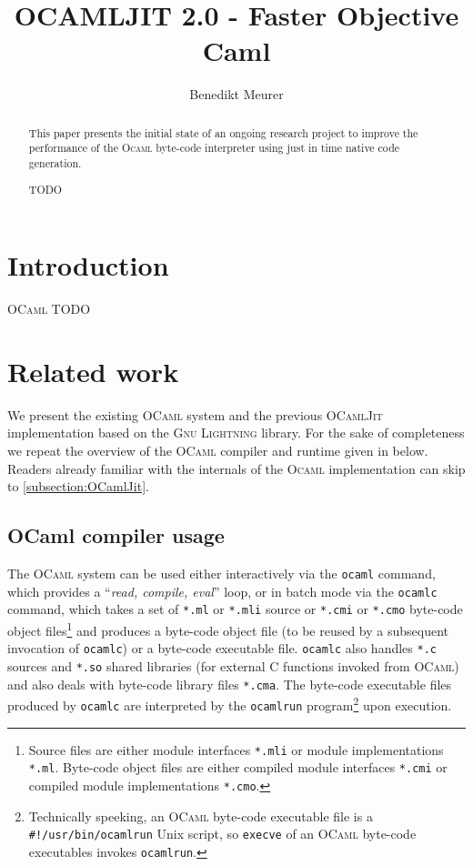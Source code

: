\documentclass[10pt,a4paper,twocolumn]{article}
\author{Benedikt Meurer}
\title{OCAMLJIT 2.0 - Faster Objective Caml}
\begin{document}
\maketitle

\begin{abstract}
  This paper presents the initial state of an ongoing research
  project to improve the performance of the \textsc{Ocaml}
  byte-code interpreter using just in time native code generation.

  TODO
\end{abstract}


\section{Introduction}

\textsc{OCaml}\cite{Leroy10} TODO


\section{Related work}

We present the existing \textsc{OCaml} system and the previous \textsc{OCamlJit}\cite{Starynkevitch04}
implementation based on the \textsc{Gnu Lightning} library\cite{Bonzini10}. For the sake of completeness
we repeat the overview of the \textsc{OCaml} compiler and runtime given in \cite{Starynkevitch04} below.
Readers already familiar with the internals of the \textsc{Ocaml} implementation can skip to
\ref{subsection:OCamlJit}.

\subsection{OCaml compiler usage}

The \textsc{OCaml} system can be used either interactively via the \texttt{ocaml} command, which
provides a ``\textit{read, compile, eval}'' loop, or in batch mode via the \texttt{ocamlc}
command, which takes a set of \texttt{*.ml} or \texttt{*.mli} source or \texttt{*.cmi} or
\texttt{*.cmo} byte-code object files\footnote{Source files are either module interfaces
  \texttt{*.mli} or module implementations \texttt{*.ml}. Byte-code object files are either
  compiled module interfaces \texttt{*.cmi} or compiled module implementations \texttt{*.cmo}.}
and produces a byte-code object file (to be reused by a subsequent invocation of \texttt{ocamlc})
or a byte-code executable file. \texttt{ocamlc} also handles \texttt{*.c} sources and \texttt{*.so}
shared libraries (for external C functions invoked from \textsc{OCaml}) and also deals with
byte-code library files \texttt{*.cma}. The byte-code executable files produced by \texttt{ocamlc}
are interpreted by the \texttt{ocamlrun} program\footnote{Technically speeking, an \textsc{OCaml}
  byte-code executable file is a \texttt{\#!/usr/bin/ocamlrun} Unix script, so \texttt{execve}
  of an \textsc{OCaml} byte-code executables invokes \texttt{ocamlrun}.} upon execution.
\end{document}

